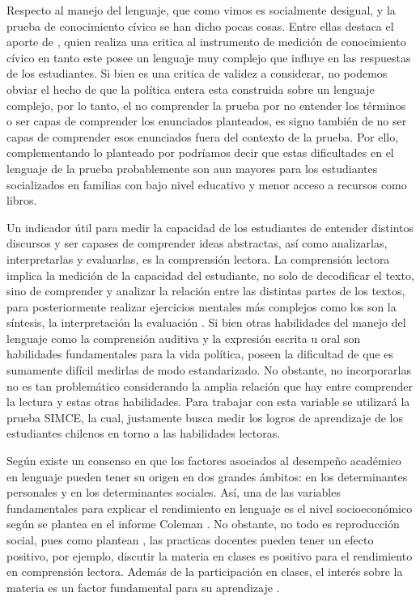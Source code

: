 \documentclass[12pt,twoside]{templates/facsothesis}
\begin{document}
Respecto al manejo del lenguaje, que como vimos es socialmente desigual, y la prueba de conocimiento cívico se han dicho pocas cosas. Entre ellas destaca el aporte de \citet{zhang_Understanding_2015}, quien realiza una critica al instrumento de medición de conocimiento cívico en tanto este posee un lenguaje muy complejo que influye en las respuestas de los estudiantes. Si bien es una critica de validez a considerar, no podemos obviar el hecho de que la política entera esta construida sobre un lenguaje complejo, por lo tanto, el no comprender la prueba por no entender los términos o ser capas de comprender los enunciados planteados, es signo también de no ser capas de comprender esos enunciados fuera del contexto de la prueba. Por ello, complementando lo planteado por \citet{zhang_Understanding_2015} podríamos decir que estas dificultades en el lenguaje de la prueba probablemente son aun mayores para los estudiantes socializados en familias con bajo nivel educativo y menor acceso a recursos como libros.

Un indicador útil para medir la capacidad de los estudiantes de entender distintos discursos y ser capases de comprender ideas abstractas, así como analizarlas, interpretarlas y evaluarlas, es la comprensión lectora. La comprensión lectora implica la medición de la capacidad del estudiante, no solo de decodificar el texto, sino de comprender y analizar la relación entre las distintas partes de los textos, para posteriormente realizar ejercicios mentales más complejos como los son la síntesis, la interpretación la evaluación \citep{ace_Informe_2018}. Si bien otras habilidades del manejo del lenguaje como la comprensión auditiva y la expresión escrita u oral son habilidades fundamentales para la vida política, poseen la dificultad de que es sumamente difícil medirlas de modo estandarizado. No obstante, no incorporarlas no es tan problemático considerando la amplia relación que hay entre comprender la lectura y estas otras habilidades. Para trabajar con esta variable se utilizará la prueba SIMCE, la cual, justamente busca medir los logros de aprendizaje de los estudiantes chilenos en torno a las habilidades lectoras.

Según \citet{barahonau_Factores_2014} existe un consenso en que los factores asociados al desempeño académico en lenguaje pueden tener su origen en dos grandes ámbitos: en los determinantes personales y en los determinantes sociales. Así, una de las variables fundamentales para explicar el rendimiento en lenguaje es el nivel socioeconómico según se plantea en el informe Coleman \citep{marques_Apuntes_2016}. No obstante, no todo es reproducción social, pues como plantean \citet{lara_mirada_2010}, las practicas docentes pueden tener un efecto positivo, por ejemplo, discutir la materia en clases es positivo para el rendimiento en comprensión lectora. Además de la participación en clases, el interés sobre la materia es un factor fundamental para su aprendizaje \citep{lozano_Relacion_2000}.
\end{document}
